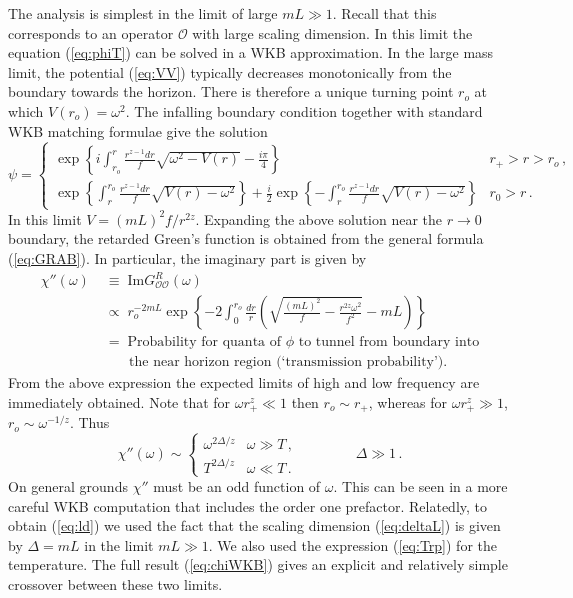\documentclass[10pt, oneside]{book}
\def\be{\begin{equation}}
\def\ee{\end{equation}}
\def\ocal{{\mathcal{O}}}
\begin{document}
\begin{doublespace}
The analysis is simplest in the limit of large $mL \gg 1$. Recall that this corresponds to an operator $\ocal$ with large scaling dimension. In this limit the equation (\ref{eq:phiT}) can be solved in a WKB approximation. In the large mass limit, the potential (\ref{eq:VV}) typically decreases monotonically from the boundary towards the horizon. There is therefore a unique turning point $r_o$ at which $V(r_o) = \omega^2$. The infalling boundary condition together with standard WKB matching formulae give the solution
\be
\psi =
\begin{cases}
\displaystyle \exp\left\{ i \int_{r_o}^r \frac{r^{z-1}dr}{f} \sqrt{\omega^2 - V(r)} - \frac{i \pi}{4} \right\}& r_+ > r > r_o \,, \\
\displaystyle  \exp\left\{ \int_{r}^{r_o} \frac{r^{z-1}dr}{f} \sqrt{V(r) - \omega^2} \right\} + \frac{i}{2} \exp\left\{ - \int_{r}^{r_o} \frac{r^{z-1}dr}{f} \sqrt{V(r) - \omega^2} \right\} & r_0 > r \,.
\end{cases}
\ee
In this limit $V = (m L)^2 f/r^{2z}$. Expanding the above solution near the $r \to 0$ boundary, the retarded Green's function is obtained from the general formula (\ref{eq:GRAB}). In particular, the imaginary part is given by
\begin{align}
\chi''(\omega)  & \; \equiv \; \text{Im} G^R_{\ocal \ocal}(\omega) \\
&  \; \propto \;  r_o^{- 2 mL} \exp\left\{ - 2 \int_{0}^{r_o} \frac{dr}{r} \left(\sqrt{\frac{(mL)^2}{f} - \frac{r^{2z} \omega^2}{f^2}} - mL\right) \right\} \label{eq:chiWKB} \\[0.2cm]
& \; = \; \text{Probability for quanta of $\phi$ to tunnel from boundary into} \nonumber \\
& \qquad \text{the near horizon region (`transmission probability').} \nonumber
\end{align}
From the above expression the expected limits of high and low frequency are immediately obtained. Note that for $\omega r^z_+ \ll 1$ then $r_o \sim r_+$, whereas for $\omega r^z_+ \gg 1$, $r_o \sim \omega^{-1/z}$. Thus
\be
\chi''(\omega) \sim
\begin{cases}
\omega^{2 \Delta/z} & \omega \gg T \,, \\
T^{2 \Delta/z} & \omega \ll T \,.
\end{cases} \qquad \qquad \Delta \gg 1 \,. \label{eq:ld}
\ee
On general grounds $\chi''$ must be an odd function of $\omega$. This can be seen in a more careful WKB computation that includes the order one prefactor. Relatedly, to obtain (\ref{eq:ld}) we used the fact that the scaling dimension (\ref{eq:deltaL}) is given by $\Delta = m L$ in the limit $mL \gg 1$. We also used the expression (\ref{eq:Trp}) for the temperature. The full result (\ref{eq:chiWKB}) gives an explicit and relatively simple
crossover between these two limits.


\end{doublespace}
\end{document}
